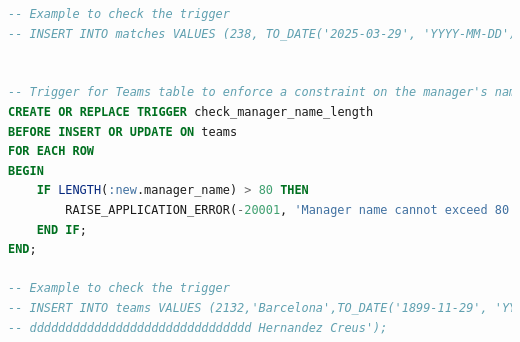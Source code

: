 \documentclass[11pt]{article}
\begin{document}
\begin{lstlisting}[language=SQL, caption=\small Triggers (\texttt{DBTriggers.sql} file)]
-- Example to check the trigger
-- INSERT INTO matches VALUES (238, TO_DATE('2025-03-29', 'YYYY-MM-DD'), 1, 1, 'Aliyar Aghayev', 40, 2, 2, 5);


-- Trigger for Teams table to enforce a constraint on the manager's name length
CREATE OR REPLACE TRIGGER check_manager_name_length
BEFORE INSERT OR UPDATE ON teams
FOR EACH ROW
BEGIN
    IF LENGTH(:new.manager_name) > 80 THEN
        RAISE_APPLICATION_ERROR(-20001, 'Manager name cannot exceed 80 characters.');
    END IF;
END;

-- Example to check the trigger
-- INSERT INTO teams VALUES (2132,'Barcelona',TO_DATE('1899-11-29', 'YYYY-MM-DD'),1,'Xavierdddddddddsdfsdfsdddddddddddddddddddddddddddddddddddddd
-- ddddddddddddddddddddddddddddddd Hernandez Creus');
\end{lstlisting}
\vspace{2em}
\end{document}
